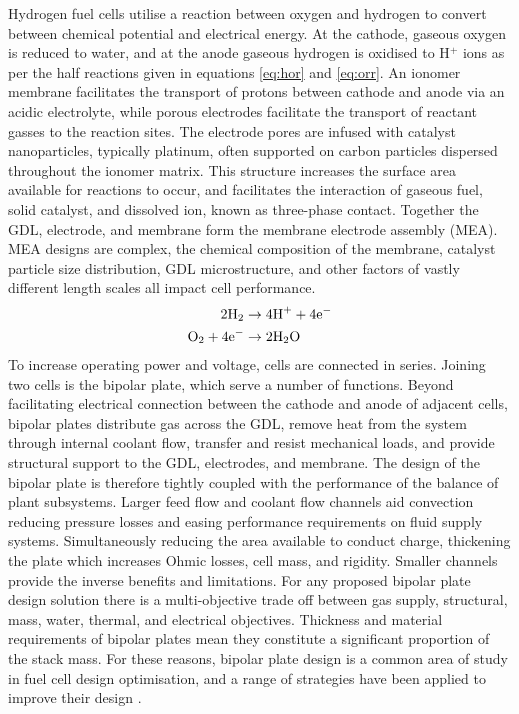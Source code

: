 Hydrogen fuel cells utilise a reaction between oxygen and hydrogen to convert between chemical potential and electrical energy.
At the cathode, gaseous oxygen is reduced to water, and at the anode gaseous hydrogen is oxidised to H$^+$ ions as per the half reactions given in equations \ref{eq:hor} and \ref{eq:orr}.
An ionomer membrane facilitates the transport of protons between cathode and anode via an acidic electrolyte, while porous electrodes facilitate the transport of reactant gasses to the reaction sites.
The electrode pores are infused with catalyst nanoparticles, typically platinum, often supported on carbon particles dispersed throughout the ionomer matrix.
This structure increases the surface area available for reactions to occur, and facilitates the interaction of gaseous fuel, solid catalyst, and dissolved ion, known as three-phase contact.
Together the GDL, electrode, and membrane form the membrane electrode assembly (MEA).
MEA designs are complex, the chemical composition of the membrane, catalyst particle size distribution, GDL microstructure, and other factors of vastly different length scales all impact cell performance.
\begin{align}
	2\text{H}_2             & \rightarrow 4 \text{H}^+ + 4 \text{e}^- \label{eq:hor} \\
	\text{O}_2 + 4\text{e}^- & \rightarrow 2\text{H}_2\text{O} \label{eq:orr}
\end{align}
To increase operating power and voltage, cells are connected in series.
Joining two cells is the bipolar plate, which serve a number of functions.
Beyond facilitating electrical connection between the cathode and anode of adjacent cells, bipolar plates distribute gas across the GDL, remove heat from the system through internal coolant flow, transfer and resist mechanical loads, and provide structural support to the GDL, electrodes, and membrane.
The design of the bipolar plate is therefore tightly coupled with the performance of the balance of plant subsystems.
Larger feed flow and coolant flow channels aid convection reducing pressure losses and easing performance requirements on fluid supply systems.
Simultaneously reducing the area available to conduct charge, thickening the plate which increases Ohmic losses, cell mass, and rigidity.
Smaller channels provide the inverse benefits and limitations.
For any proposed bipolar plate design solution there is a multi-objective trade off between gas supply, structural, mass, water, thermal, and electrical objectives.
Thickness and material requirements of bipolar plates mean they constitute a significant proportion of the stack mass.
For these reasons, bipolar plate design is a common area of study in fuel cell design optimisation, and a range of strategies have been applied to improve their design \cite{liReviewBipolarPlates2005}.

